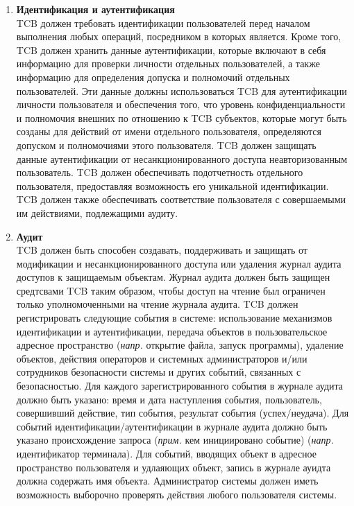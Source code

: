 \begin{enumerate}
\begin{enumerate}
		\begin{enumerate}
			\item{\textbf{Идентификация и аутентификация}}\\
			TCB должен требовать идентификации пользователей перед началом выполнения любых операций, посредником в которых является. Кроме того, TCB должен хранить данные аутентификации, 
			которые включают в себя информацию для проверки личности отдельных пользователей, а также информацию для определения допуска и полномочий отдельных пользователей. Эти данные должны 
			использоваться TCB для аутентификации личности пользователя и обеспечения того, что уровень конфиденциальности и полномочия внешних по отношению к TCB субъектов, которые 
			могут быть созданы для действий от имени отдельного пользователя, определяются допуском и полномочиями этого пользователя. TCB должен защищать данные аутентификации от 
			несанкционированного доступа неавторизованным пользователь. TCB должен обеспечивать подотчетность отдельного пользователя, предоставляя возможность его уникальной идентификации.
			TCB должен также обеспечивать соответствие пользователя с совершаемыми им действиями, подлежащими аудиту.
			\item{\textbf{Аудит}}\\
			TCB должен быть способен создавать, поддерживать и защищать от модификации и несанкционированного доступа или удаления журнал аудита доступов к защищаемым объектам. Журнал аудита 
			должен быть защищен средтсвами TCB таким образом, чтобы доступ на чтение был ограничен только уполномоченными на чтение журнала аудита. TCB должен регистрировать следующие события
			в системе: использование механизмов идентификации и аутентификации, передача объектов в пользовательское адресное пространство (\textit{напр.} открытие файла, запуск программы),
			удаление объектов, действия операторов и системных администраторов и/или сотрудников безопасности системы и других событий, связанных с безопасностью. Для каждого зарегистрированного
			события в журнале аудита должно быть указано: время и дата наступления события, пользователь, совершивший действие, тип события, результат события (успех/неудача). Для событий
			идентификации/аутентификации в журнале аудита должно быть указано происхождение запроса (\textit{прим. } кем инициировано событие) (\textit{напр.} идентификатор терминала). Для событий,
			вводящих объект в адресное пространство пользователя и удлаяющих объект, запись в журнале ауидта должна содержать имя объекта. Администратор системы должен иметь возможность выборочно
			проверять действия любого пользователя системы.

\end{enumerate}
\end{enumerate}
\end{enumerate}
